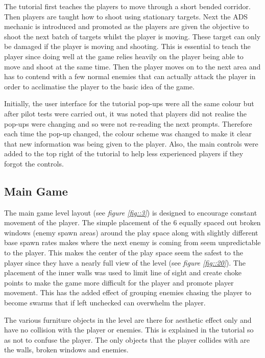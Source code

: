 \documentclass[journal]{IEEEtran}
\begin{document}
The tutorial first teaches the players to move through a short bended corridor. Then players are taught how to shoot using stationary targets. Next the ADS mechanic is introduced and promoted as the players are given the objective to shoot the next batch of targets whilst the player is moving. These target can only be damaged if the player is moving and shooting. This is essential to teach the player since doing well at the game relies heavily on the player being able to move and shoot at the same time. Then the player moves on to the next area and has to contend with a few normal enemies that can actually attack the player in order to acclimatise the player to the basic idea of the game.

Initially, the user interface for the tutorial pop-ups were all the same colour but after pilot tests were carried out, it was noted that players did not realise the pop-ups were changing and so were not re-reading the next prompts. Therefore each time the pop-up changed, the colour scheme was changed to make it clear that new information was being given to the player. Also, the main controls were added to the top right of the tutorial to help less experienced players if they forgot the controls. 

\subsection{Main Game}
The main game level layout (see \textit{figure \ref{fig::3}}) is designed to encourage constant movement of the player. The simple placement of the 6 equally spaced out broken windows (enemy spawn areas) around the play space along with slightly different base spawn rates makes where the next enemy is coming from seem unpredictable to the player. This makes the center of the play space seem the safest to the player since they have a nearly full view of the level (see \textit{figure \ref{fig::20}}). The placement of the inner walls was used to limit line of sight and create choke points to make the game more difficult for the player and promote player movement. This has the added effect of grouping enemies chasing the player to become swarms that if left unchecked can overwhelm the player.

The various furniture objects in the level are there for aesthetic effect only and have no collision with the player or enemies. This is explained in the tutorial so as not to confuse the player. The only objects that the player collides with are the walls, broken windows and enemies.
\end{document}
